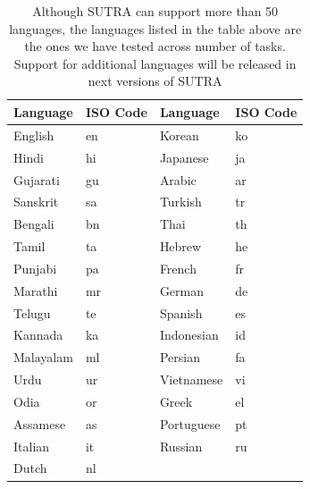 \documentclass{article}
\begin{document}
\begin{table}[tb]
\setlength{\abovecaptionskip}{10pt} %
\setlength{\belowcaptionskip}{5pt} %
\centering
\begin{tabular}{llll}
\toprule
\textbf{Language}  & \textbf{ISO Code} & \textbf{Language}    & \textbf{ISO Code} \\ \midrule
English            & en                & Korean               & ko                \\
Hindi            & hi                & Japanese               & ja                \\
Gujarati            & gu                & Arabic               & ar                \\
Sanskrit            & sa                & Turkish               & tr                \\
Bengali            & bn                & Thai               & th                \\
Tamil            & ta                & Hebrew               & he                \\
Punjabi            & pa                & French               & fr                \\
Marathi            & mr                & German               & de                \\
Telugu            & te                & Spanish               & es                \\
Kannada            & ka                & Indonesian               & id                \\
Malayalam            & ml                & Persian               & fa                \\
Urdu            & ur                & Vietnamese               & vi                \\
Odia            & or                & Greek               & el                \\         
Assamese               & as                &        Portuguese             & pt                   \\ 
Italian               & it                &        Russian             & ru                   \\ 
Dutch               & nl                &                     &                    \\ \bottomrule

 
\end{tabular}
\caption{Although SUTRA can support more than 50 languages, the languages listed in the table above are the ones we have tested across number of tasks. Support for additional languages will be released in next versions of SUTRA}
\label{table:supported_languages}
\end{table}
\end{document}
